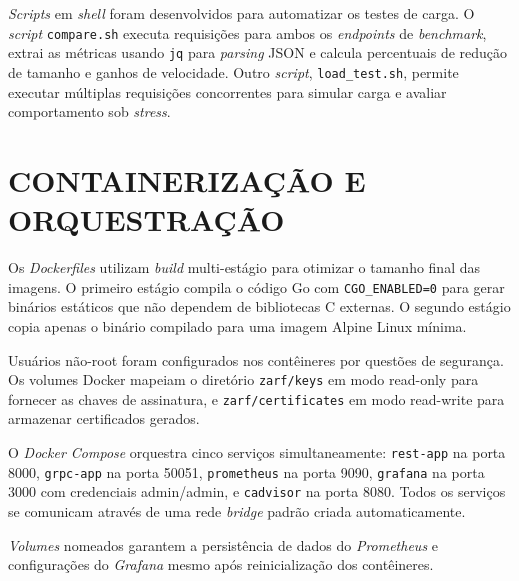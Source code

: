 \textit{Scripts} em \textit{shell} foram desenvolvidos para automatizar os testes de carga. O \textit{script} \texttt{compare.sh} executa requisições para ambos os \textit{endpoints} de \textit{benchmark}, extrai as métricas usando \texttt{jq} para \textit{parsing} JSON e calcula percentuais de redução de tamanho e ganhos de velocidade. Outro \textit{script}, \texttt{load\_test.sh}, permite executar múltiplas requisições concorrentes para simular carga e avaliar comportamento sob \textit{stress}.

\section{CONTAINERIZAÇÃO E ORQUESTRAÇÃO}\label{sec:containers}

Os \textit{Dockerfiles} utilizam \textit{build} multi-estágio para otimizar o tamanho final das imagens. O primeiro estágio compila o código Go com \texttt{CGO\_ENABLED=0} para gerar binários estáticos que não dependem de bibliotecas C externas. O segundo estágio copia apenas o binário compilado para uma imagem Alpine Linux mínima.

Usuários não-root foram configurados nos contêineres por questões de segurança. Os volumes Docker mapeiam o diretório \texttt{zarf/keys} em modo read-only para fornecer as chaves de assinatura, e \texttt{zarf/certificates} em modo read-write para armazenar certificados gerados.

O \textit{Docker Compose} orquestra cinco serviços simultaneamente: \texttt{rest-app} na porta 8000, \texttt{grpc-app} na porta 50051, \texttt{prometheus} na porta 9090, \texttt{grafana} na porta 3000 com credenciais admin/admin, e \texttt{cadvisor} na porta 8080. Todos os serviços se comunicam através de uma rede \textit{bridge} padrão criada automaticamente.

\textit{Volumes} nomeados garantem a persistência de dados do \textit{Prometheus} e configurações do \textit{Grafana} mesmo após reinicialização dos contêineres.
